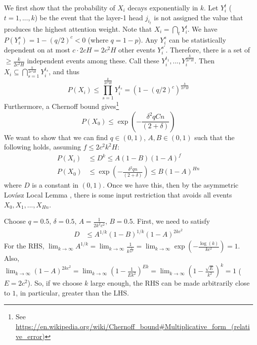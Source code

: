 \documentclass[11pt,a4paper]{article}
\begin{document}
We first show that the probability of $X_i$ decays exponentially in $k$.
Let $Y_i^t$ ($t=1,...,k$) be the event that the layer-1 head $j_{i_t}$ is not assigned the value that produces the highest attention weight.
Note that $X_i = \bigcap_t Y_i^t$.
We have $P(Y_i^s) = 1-(q/2)^c < 0$ (where $q = 1-p$).
Any $Y_i^s$ can be statistically dependent on at most $c \cdot 2cH = 2c^2H$ other events $Y_i^{s'}$.
Therefore, there is a set of $\geq \frac{k}{2c^2H}$ independent events among these.
Call these $Y_i^{t_1}, ..., Y_i^{\frac{k}{2c^2H}}$.
Then $X_i \subseteq \bigcap_{s=1}^{\frac{k}{2c^2H}} Y_i^{t_s}$, and thus
\begin{equation}
    P(X_i) \leq \prod_{s=1}^{\frac{k}{2c^2H}} Y_i^{t_s} = \left(1-(q/2)^c\right)^{\frac{k}{2c^2H}}
\end{equation}
Furthermore, a Chernoff bound gives\footnote{See 
\url{https://en.wikipedia.org/wiki/Chernoff_bound#Multiplicative_form_(relative_error)}}
\begin{equation}
P(X_0) \leq    \exp\left(-\frac{\delta^2qCn}{(2+\delta)}\right)
\end{equation}
We want to show that we can find $q \in (0,1)$, $A, B \in (0,1)$ such that the following holds, assuming $f \leq 2c^2k^2H$:
\begin{align}
 P(X_i) &\leq  D^k \leq A(1-B)(1-A)^f \\
P(X_0) &\leq \exp\left(-\frac{\delta^2qn}{(2+\delta)}\right)  \leq B (1-A)^{Hn}
\end{align}
where $D$ is a constant in $(0,1)$.
Once we have this, then by the asymmetric Lov{\'a}sz Local Lemma \cite{mitzenmacherprobability}, there is some input restriction that avoids all events $X_0, X_1, ..., X_{Hn}$.

Choose $q=0.5$, $\delta=0.5$, $A=\frac{1}{2k^2c^2}$, $B=0.5$.
First, we need to satisfy
\begin{align}
    D &\leq A^{1/k}(1-B)^{1/k}(1-A)^{2kc^2} 
\end{align}
For the RHS, 
$\lim_{k\rightarrow \infty} A^{1/k} = \lim_{k\rightarrow \infty} \frac{1}{k^\frac{1}{kc^2}} = \lim_{k\rightarrow \infty} \exp(-\frac{\log(k)}{kc^2}) = 1$.
Also, $\lim_{k\rightarrow \infty} (1-A)^{2kc^2} = \lim_{k\rightarrow \infty} (1-\frac{1}{Ek^2})^{Ek} = \lim_{k\rightarrow \infty} (1-\frac{\sqrt{E}}{k^2})^{k} = 1$ ($E = 2c^2$). So, if we choose $k$ large enough, the RHS can be made arbitrarily close to $1$, in particular, greater than the LHS.
\end{document}
